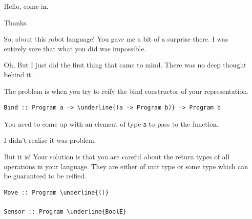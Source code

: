 \begin{dialogue} 

\speak{\docname{}} Hello, come in. 

\speak{\studname{}} Thanks. 

\speak{\docname{}} So, about this robot language! You gave me a bit of a 
surprise there. I was entirely sure that what you did was impossible. 

\speak{\studname{}} Oh, But I just did the first thing that came to mind. 
There was no deep thought behind it. 

\speak{\docname{}} The problem is 
 when you try to reify the bind constructor of your representation.
\end{dialogue} 


\begin{small}
\begin{Verbatim}[commandchars=\\\{\}] 
Bind :: Program a -> \underline{(a -> Program b)} -> Program b 
\end{Verbatim}
\end{small}


\begin{dialogue}
\speak{\docname{}} You need to come up with an element of type {\tt a} to 
pass to the function. 

\speak{\studname{}} I didn't realise it was problem. 

\speak{\docname{}} But it is! Your solution is that you are careful
about the return types of all operations in your language. They are
either of unit type or some type which can be guaranteed to be reified.

\end {dialogue} 

\begin{small}
\begin{Verbatim}[commandchars=\\\{\}] 
Move :: Program \underline{()}
  
Sensor :: Program \underline{BoolE}
\end{Verbatim}
\end{small}

